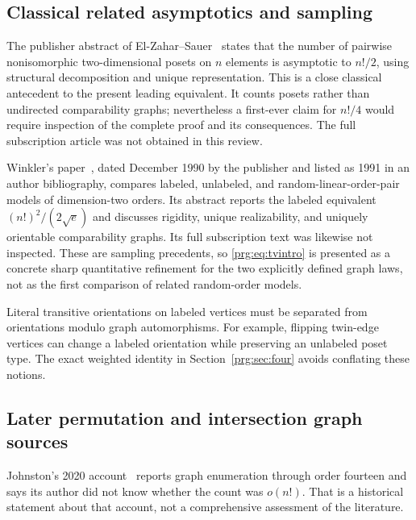 \documentclass[11pt,letterpaper]{article}
\numberwithin{equation}{section}
\theoremstyle{definition}\newtheorem{definition}[theorem]{Definition}
\theoremstyle{remark}\newtheorem{remark}[theorem]{Remark}
\begin{document}
\subsection{Classical related asymptotics and sampling}
The publisher abstract of El-Zahar--Sauer~\cite{ES} states that the
number of pairwise nonisomorphic two-dimensional posets on $n$
elements is asymptotic to $n!/2$, using structural decomposition and
unique representation. This is a close classical antecedent to the
present leading equivalent. It counts posets rather than undirected
comparability graphs; nevertheless a first-ever claim for $n!/4$
would require inspection of the complete proof and its consequences.
The full subscription article was not obtained in this review.

Winkler's paper~\cite{Winkler}, dated December 1990 by the publisher
and listed as 1991 in an author bibliography, compares labeled,
unlabeled, and random-linear-order-pair models of dimension-two
orders. Its abstract reports the labeled equivalent
$(n!)^2/(2\sqrt e)$ and discusses rigidity, unique realizability,
and uniquely orientable comparability graphs. Its full subscription
text was likewise not inspected. These are sampling precedents,
so \eqref{prg:eq:tvintro} is presented as a concrete sharp quantitative
refinement for the two explicitly defined graph laws, not as the
first comparison of related random-order models.

Literal transitive orientations on labeled vertices must be
separated from orientations modulo graph automorphisms. For example,
flipping twin-edge vertices can change a labeled orientation while
preserving an unlabeled poset type. The exact weighted identity in
Section~\ref{prg:sec:four} avoids conflating these notions.

\subsection{Later permutation and intersection graph sources}
Johnston's 2020 account~\cite{Johnston} reports graph enumeration
through order fourteen and says its author did not know whether
the count was $o(n!)$. That is a historical statement about that
account, not a comprehensive assessment of the literature.
\end{document}
